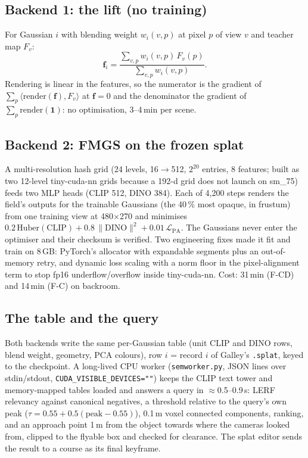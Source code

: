 \documentclass[11pt,a4paper]{article}
\newcommand{\code}[1]{\texttt{#1}}
\begin{document}
\subsection{Backend 1: the lift (no training)}
For Gaussian $i$ with blending weight $w_i(v,p)$ at pixel $p$ of view $v$ and teacher map $F_v$:
\[ \mathbf f_i = \frac{\sum_{v,p} w_i(v,p)\,F_v(p)}{\sum_{v,p} w_i(v,p)} . \]
Rendering is linear in the features, so the numerator is the gradient of
$\sum_p\langle \mathrm{render}(\mathbf f),F_v\rangle$ at $\mathbf f=0$ and the denominator the
gradient of $\sum_p \mathrm{render}(\mathbf 1)$: no optimisation, 3--4\,min per scene.

\subsection{Backend 2: FMGS on the frozen splat}
A multi-resolution hash grid (24 levels, 16$\rightarrow$512, $2^{20}$ entries, 8 features; built as
two 12-level tiny-cuda-nn grids because a 192-d grid does not launch on sm\_75) feeds two MLP heads
(CLIP 512, DINO 384). Each of 4{,}200 steps renders the field's outputs for the trainable Gaussians
(the 40\,\% most opaque, in frustum) from one training view at 480$\times$270 and minimises
$0.2\,\mathrm{Huber}(\text{CLIP}) + 0.8\,\|\text{DINO}\|^2 + 0.01\,\mathcal L_{\text{PA}}$. The Gaussians
never enter the optimiser and their checksum is verified. Two engineering fixes made it fit and
train on 8\,GB: PyTorch's allocator with expandable segments plus an out-of-memory retry, and dynamic
loss scaling with a norm floor in the pixel-alignment term to stop fp16 underflow/overflow inside
tiny-cuda-nn. Cost: 31\,min (F-CD) and 14\,min (F-C) on backroom.

\subsection{The table and the query}
Both backends write the same per-Gaussian table (unit CLIP and DINO rows, blend weight, geometry,
PCA colours), row $i$ = record $i$ of Galley's \code{.splat}, keyed to the checkpoint. A long-lived
CPU worker (\code{semworker.py}, JSON lines over stdin/stdout, \code{CUDA\_VISIBLE\_DEVICES=""}) keeps the
CLIP text tower and memory-mapped tables loaded and answers a query in $\approx$0.5--0.9\,s:
LERF relevancy against canonical negatives, a threshold relative to the query's own peak
($\tau = 0.55 + 0.5(\text{peak}-0.55)$), 0.1\,m voxel connected components, ranking, and an approach
point 1\,m from the object towards where the cameras looked from, clipped to the flyable box and
checked for clearance. The splat editor sends the result to a course as its final keyframe.
\end{document}
